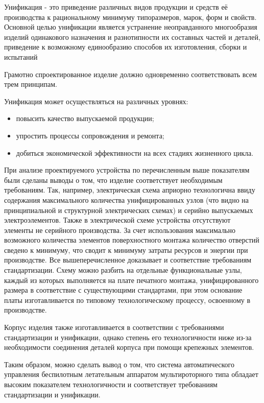 Унификация - это приведение различных видов продукции и средств её
производства к рациональному минимуму типоразмеров, марок, форм и
свойств. Основной целью унификации является устранение неоправданного
многообразия изделий одинакового назначения и разнотипности их
составных частей и деталей, приведение к возможному единообразию
способов их изготовления, сборки и испытаний~\cite{Lanin2019}

Грамотно спроектированное изделие должно одновременно соответствовать
всем трем принципам.

Унификация может осуществляться на различных уровнях:
\begin{itemize}
\item повысить качество выпускаемой продукции;
\item упростить процессы сопровождения и ремонта;
\item добиться экономической эффективности на всех стадиях жизненного цикла.
\end{itemize}

При анализе проектируемого устройства по перечисленным выше
показателям были сделаны выводы о том, что изделие соответствует
необходимым требованиям. Так, например, электрическая схема априорно
технологична ввиду содержания максимального количества унифицированных
узлов (что видно на принципиальной и структурной электрических схемах)
и серийно выпускаемых электроэлементов. Также в электрической схеме
устройства отсутствуют элементы не серийного производства. За счет
использования максимально возможного количества элементов
поверхностного монтажа количество отверстий сведено к минимуму, что
сводит к минимуму затраты ресурсов и энергии при производстве. Все
вышеперечисленное доказывает и соответствие требованиям
стандартизации. Схему можно разбить на отдельные функциональные узлы,
каждый из которых выполняется на плате печатного монтажа,
унифицированного размера в соответствие с существующими стандартами,
при этом основание платы изготавливается по типовому технологическому
процессу, освоенному в производстве.

Корпус изделия также изготавливается в соответствии с требованиями
стандартизации и унификации, однако степень его технологичности ниже
из-за необходимости соединения деталей корпуса при помощи крепежных
элементов.

Таким образом, можно сделать вывод о том, что система автоматического
управления беспилотным летательным аппаратом мультироторного типа
обладает высоким показателем технологичности и соответствует
требованиям стандартизации и унификации.

\newpage


